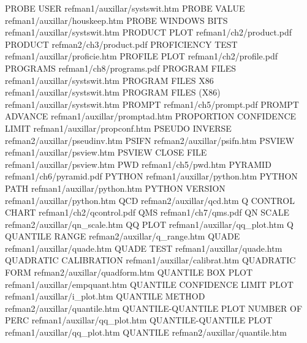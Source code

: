 PROBE USER                              refman1/auxillar/systswit.htm
PROBE VALUE                             refman1/auxillar/houskeep.htm
PROBE WINDOWS BITS                      refman1/auxillar/systswit.htm
PRODUCT PLOT                            refman1/ch2/product.pdf
PRODUCT                                 refman2/ch3/product.pdf
PROFICIENCY TEST                        refman1/auxillar/proficie.htm
PROFILE PLOT                            refman1/ch2/profile.pdf
PROGRAMS                                refman1/ch8/programs.pdf
PROGRAM FILES                           refman1/auxillar/systswit.htm
PROGRAM FILES X86                       refman1/auxillar/systswit.htm
PROGRAM FILES (X86)                     refman1/auxillar/systswit.htm
PROMPT                                  refman1/ch5/prompt.pdf
PROMPT ADVANCE                          refman1/auxillar/promptad.htm
PROPORTION CONFIDENCE LIMIT             refman1/auxillar/propconf.htm
PSEUDO INVERSE                          refman2/auxillar/pseudinv.htm
PSIFN                                   refman2/auxillar/psifn.htm
PSVIEW                                  refman1/auxillar/psview.htm
PSVIEW CLOSE FILE                       refman1/auxillar/psview.htm
PWD                                     refman1/ch5/pwd.htm
PYRAMID                                 refman1/ch6/pyramid.pdf
PYTHON                                  refman1/auxillar/python.htm
PYTHON PATH                             refman1/auxillar/python.htm
PYTHON VERSION                          refman1/auxillar/python.htm
QCD                                     refman2/auxillar/qcd.htm
Q CONTROL CHART                         refman1/ch2/qcontrol.pdf
QMS                                     refman1/ch7/qms.pdf
QN SCALE                                refman2/auxillar/qn_scale.htm
QQ PLOT                                 refman1/auxillar/qq_plot.htm
Q QUANTILE RANGE                        refman2/auxillar/q_range.htm
QUADE                                   refman1/auxillar/quade.htm
QUADE TEST                              refman1/auxillar/quade.htm
QUADRATIC CALIBRATION                   refman1/auxillar/calibrat.htm
QUADRATIC FORM                          refman2/auxillar/quadform.htm
QUANTILE BOX PLOT                       refman1/auxillar/empquant.htm
QUANTILE CONFIDENCE LIMIT PLOT          refman1/auxillar/i_plot.htm
QUANTILE METHOD                         refman2/auxillar/quantile.htm
QUANTILE-QUANTILE PLOT NUMBER OF PERC   refman1/auxillar/qq_plot.htm
QUANTILE-QUANTILE PLOT                  refman1/auxillar/qq_plot.htm
QUANTILE                                refman2/auxillar/quantile.htm
